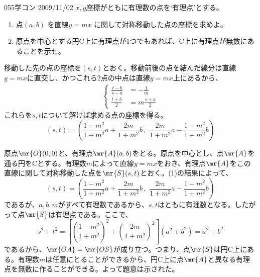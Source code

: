 \begin{prob}{055}{}{学コン 2009/11/02}
 $x,y$座標がともに有理数の点を`有理点'とする。
 \begin{enumerate}
  \item 点$(a,b)$ を直線$y=mx$ に関して対称移動した点の座標を求めよ。
  \item 原点を中心とする円C上に有理点が1つでもあれば、C上に有理点が無数にあることを示せ。
 \end{enumerate}
\end{prob}
移動した先の点の座標を$(s, t)$とおく。移動前後の点を結んだ線分は直線$y=mx$に直交し、かつこれら2点の中点は直線$y=mx$上にあるから、
\begin{align*}
 \left\{
 \begin{aligned}
  \frac{t-b}{s-a}&=-\frac{1}{m} \\
  \frac{t+b}{2}&=m\frac{s+a}{2}
 \end{aligned}\right.
\end{align*}
これらを$s, t$について解けば求める点の座標を得る。
\[ (s, t) = \left( \frac{1-m^2}{1+m^2}a+\frac{2m}{1+m^2}b \,,\,\, \frac{2m}{1+m^2}a-\frac{1-m^2}{1+m^2}b \right) \]

原点$\mr{O}(0,0)$と、有理点$\mr{A}(a, b)$をとる。原点を中心とし、点$\mr{A}$を通る円をCとする。有理数$m$によって直線$y=mx$をおき、有理点$\mr{A}$をこの直線に関して対称移動した点を$\mr{S}(s, t)$とおく。(1)の結果によって、
\[ (s, t) = \left( \frac{1-m^2}{1+m^2}a+\frac{2m}{1+m^2}b \,,\,\, \frac{2m}{1+m^2}a-\frac{1-m^2}{1+m^2}b \right) \]
であるが、$a, b, m$がすべて有理数であるから、$s, t$はともに有理数となる。したがって点$\mr{S}$は有理点である。ここで、
\[ s^2+t^2=\left[\left(\frac{1-m^2}{1+m^2}\right)^2+\left(\frac{2m}{1+m^2}\right)^2\right](a^2+b^2)=a^2+b^2 \]
であるから、$\mr{OA}=\mr{OS}$が成り立つ。つまり、点$\mr{S}$は円C上にある。有理数$m$は任意にとることができるから、円C上に点$\mr{A}$と異なる有理点を無数に作ることができる。よって題意は示された。